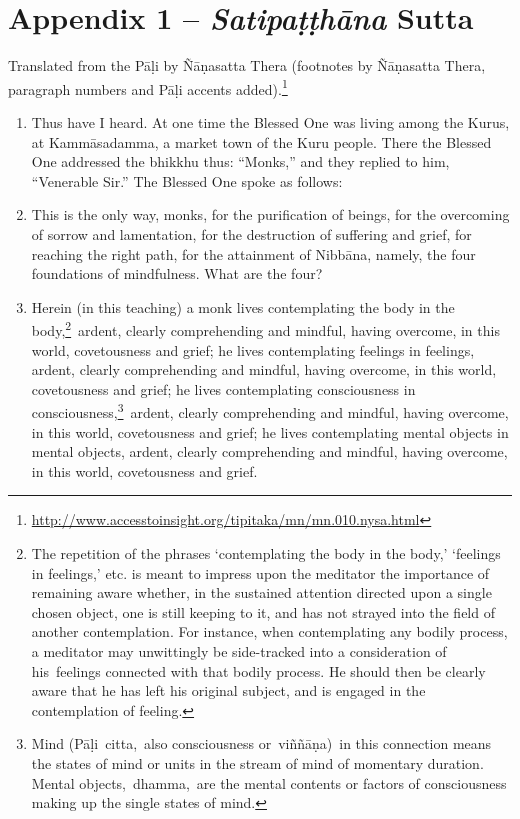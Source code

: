 \section{Appendix 1 -- \textit{Satipaṭṭhāna} Sutta}

Translated from the Pāḷi by Ñāṇasatta Thera (footnotes by Ñāṇasatta Thera, paragraph numbers and Pāḷi accents added).\footnote{\url{http://www.accesstoinsight.org/tipitaka/mn/mn.010.nysa.html}}

\begin{enumerate}
\item Thus have I heard. At one time the Blessed One was living among the Kurus, at Kammāsadamma, a market town of the Kuru people. There the Blessed One addressed the bhikkhu thus: ``Monks,” and they replied to him, ``Venerable Sir.” The Blessed One spoke as follows:
\item This is the only way, monks, for the purification of beings, for the overcoming of sorrow and lamentation, for the destruction of suffering and grief, for reaching the right path, for the attainment of Nibbāna, namely, the four foundations of mindfulness. What are the four?
\item Herein (in this teaching) a monk lives contemplating the body in the body,\footnote{The repetition of the phrases ‘contemplating the body in the body,’ ‘feelings in feelings,’ etc. is meant to impress upon the meditator the importance of remaining aware whether, in the sustained attention directed upon a single chosen object, one is still keeping to it, and has not strayed into the field of another contemplation. For instance, when contemplating any bodily process, a meditator may unwittingly be side-tracked into a consideration of his feelings connected with that bodily process. He should then be clearly aware that he has left his original subject, and is engaged in the contemplation of feeling.} ardent, clearly comprehending and mindful, having overcome, in this world, covetousness and grief; he lives contemplating feelings in feelings, ardent, clearly comprehending and mindful, having overcome, in this world, covetousness and grief; he lives contemplating consciousness in consciousness,\footnote{Mind (Pāḷi citta, also consciousness or viññāṇa) in this connection means the states of mind or units in the stream of mind of momentary duration. Mental objects, dhamma, are the mental contents or factors of consciousness making up the single states of mind.} ardent, clearly comprehending and mindful, having overcome, in this world, covetousness and grief; he lives contemplating mental objects in mental objects, ardent, clearly comprehending and mindful, having overcome, in this world, covetousness and grief.
\end{enumerate}

